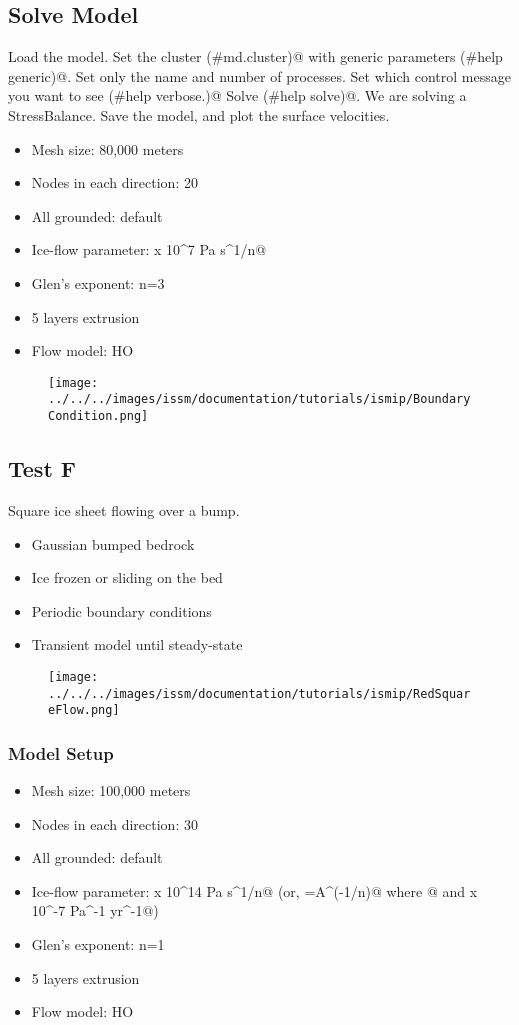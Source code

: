 \subsection{Solve Model} %
Load the \verb@BoundaryConditions@ model. Set the cluster \verb@(#md.cluster)@ with generic parameters \verb@(#help generic)@. Set only the name and number of processes. Set which control message you want to see \verb@(#help verbose.)@ Solve \verb@(#help solve)@. We are solving a StressBalance. Save the model, and plot the surface velocities.
\begin{itemize}
	\item Mesh size: 80,000 meters
	\item Nodes in each direction: 20
	\item All grounded: default
	\item Ice-flow parameter:  x 10^7 Pa s^1/n@
	\item Glen's exponent: n=3
	\item 5 layers extrusion
	\item Flow model: HO
\end{itemize}
\begin{figure}[H]
	\begin{center}
		\texttt{[image: ../../../images/issm/documentation/tutorials/ismip/BoundaryCondition.png]}
	\end{center}
\end{figure}
\subsection{Test F} %
Square ice sheet flowing over a bump.
\begin{itemize}
	\item Gaussian bumped bedrock
	\item Ice frozen or sliding on the bed
	\item Periodic boundary conditions
	\item Transient model until steady-state
\end{itemize}
\begin{figure}[H]
	\begin{center}
		\texttt{[image: ../../../images/issm/documentation/tutorials/ismip/RedSquareFlow.png]}
	\end{center}
\end{figure}
\subsubsection{Model Setup}
\begin{itemize}
	\item Mesh size: 100,000 meters
	\item Nodes in each direction: 30
	\item All grounded: default
	\item Ice-flow parameter:  x 10^14 Pa s^1/n@ (or, \verb@B=A^(-1/n)@ where @ and  x 10^-7 Pa^-1 yr^-1@)
	\item Glen's exponent: n=1
	\item 5 layers extrusion
	\item Flow model: HO
\end{itemize}
